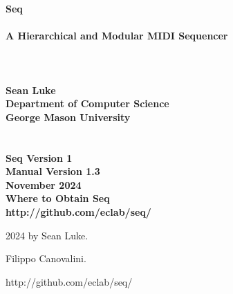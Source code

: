 \documentclass[twoside,10pt]{article}
\newcommand\booktitle{Seq\\~\vspace{0em}\\\LARGE A Hierarchical and Modular MIDI Sequencer\\}
\newcommand\reference[1]{\vspace{0.5em}\hfill{\parbox{6in}{\raggedleft\noindent\textsf{#1}}}}
\begin{document}

\noindent\huge\bf \booktitle\\
\\
\\
\Large\bf Sean Luke\\
{\large\rm 
Department of Computer Science\\
George Mason University}
\\
\\
\\
\large\rm {\bf Seq Version 1}\\
\large\rm {\bf Manual Version 1.3}\\
\large\rm  November 2024\\

\vspace{5in}
\noindent\Large\bf Where to Obtain Seq\\
\large\rm http:/\!/github.com/eclab/seq/

\clearpage

\small 
{}  2024 by Sean Luke.

\vspace{0.25in}
 Filippo Canovalini.

\vspace{0.25in}


\reference{http:/\!/github.com/eclab/seq/}

\vspace{0.15in}
\end{document}
